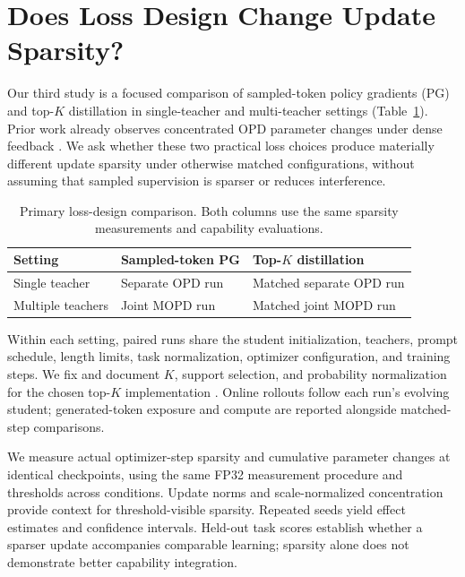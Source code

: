 \section{Does Loss Design Change Update Sparsity?}
\label{sec:density}

Our third study is a focused comparison of sampled-token policy gradients
(PG) and top-$K$ distillation in single-teacher and multi-teacher settings
(Table~\ref{tab:density_controls}). Prior work already observes concentrated
OPD parameter changes under dense feedback \citep{yu2026denseupdates}.
We ask whether these two practical loss choices produce materially different
update sparsity under otherwise matched configurations, without assuming
that sampled supervision is sparser or reduces interference.

\begin{table}[t]
\centering
\small
\begin{tabular}{lll}
\toprule
Setting & Sampled-token PG & Top-$K$ distillation \\
\midrule
Single teacher & Separate OPD run & Matched separate OPD run \\
Multiple teachers & Joint MOPD run & Matched joint MOPD run \\
\bottomrule
\end{tabular}
\caption{Primary loss-design comparison. Both columns use the same sparsity
measurements and capability evaluations.}
\label{tab:density_controls}
\end{table}

Within each setting, paired runs share the student initialization, teachers,
prompt schedule, length limits, task normalization, optimizer configuration,
and training steps. We fix and document $K$, support selection, and probability
normalization for the chosen top-$K$ implementation
\citep{ma2026mopdmultiteacheronpolicydistillation}. Online rollouts follow each
run's evolving student; generated-token exposure and compute are reported
alongside matched-step comparisons.

We measure actual optimizer-step sparsity and cumulative parameter changes
at identical checkpoints, using the same FP32 measurement procedure and
thresholds across conditions. Update norms and scale-normalized concentration
provide context for threshold-visible sparsity. Repeated seeds yield effect
estimates and confidence intervals. Held-out task scores establish whether
a sparser update accompanies comparable learning; sparsity alone does not
demonstrate better capability integration.

